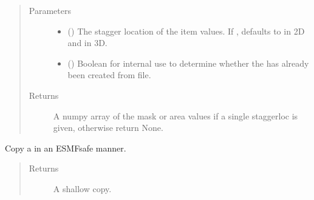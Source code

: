 \documentclass[letterpaper,10pt,english]{sphinxmanual}
\begin{document}
\begin{fulllineitems}
\begin{fulllineitems}
\begin{quote}\begin{description}
\item[{Parameters}] \leavevmode\begin{itemize}
\item {} 
 ({\hyperref[\detokenize{StaggerLoc:ESMF.api.constants.StaggerLoc}]{}}) \textendash{} The stagger location of the item
values. If , defaults to
{\hyperref[\detokenize{StaggerLoc:ESMF.api.constants.StaggerLoc.CENTER}]{}}
in 2D and {\hyperref[\detokenize{StaggerLoc:ESMF.api.constants.StaggerLoc.CENTER_VCENTER}]{}} in
3D.

\item {} 
 () \textendash{} Boolean for internal use to determine whether the
{\hyperref[\detokenize{grid:ESMF.api.grid.Grid}]{}} has already been created from file.

\end{itemize}

\item[{Returns}] \leavevmode
A numpy array of the mask or area values if a single
staggerloc is given, otherwise return None.

\end{description}\end{quote}

\end{fulllineitems}


\begin{fulllineitems}
\label{\detokenize{grid:ESMF.api.grid.Grid.copy}}
Copy a {\hyperref[\detokenize{grid:ESMF.api.grid.Grid}]{}} in an ESMF\sphinxhyphen{}safe manner.
\begin{quote}\begin{description}
\item[{Returns}] \leavevmode
A {\hyperref[\detokenize{grid:ESMF.api.grid.Grid}]{}} shallow copy.


\end{description}
\end{quote}
\end{fulllineitems}
\end{fulllineitems}
\end{document}
